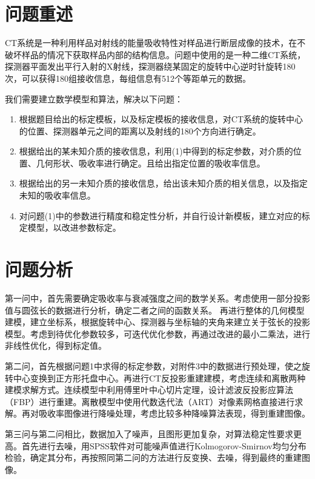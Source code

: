 \documentclass{myart}
\begin{document}
\newpage

\pagestyle{plain}
\section{问题重述}
CT系统是一种利用样品对射线的能量吸收特性对样品进行断层成像的技术，在不破坏样品的情况下获取样品内部的结构信息。问题中使用的是一种二维CT系统，探测器平面发出平行入射的X射线，探测器绕某固定的旋转中心逆时针旋转180次，可以获得180组接收信息，每组信息有512个等距单元的数据。

我们需要建立数学模型和算法，解决以下问题：
\begin{enumerate}

\item 根据题目给出的标定模板，以及标定模板的接收信息，对CT系统的旋转中心的位置、探测器单元之间的距离以及射线的180个方向进行确定。

\item 根据给出的某未知介质的接收信息，利用(1)中得到的标定参数，对介质的位置、几何形状、吸收率进行确定。且给出指定位置的吸收率信息。
\item 根据给出的另一未知介质的接收信息，给出该未知介质的相关信息，以及指定未知的吸收率信息。
\item 对问题(1)中的参数进行精度和稳定性分析，并自行设计新模板，建立对应的标定模型，以改进参数标定。
\end{enumerate}

\section{问题分析}
第一问中，首先需要确定吸收率与衰减强度之间的数学关系。考虑使用一部分投影值与圆弦长的数据进行分析，确定二者之间的函数关系。 再进行整体的几何模型建模，建立坐标系，根据旋转中心、探测器与坐标轴的夹角来建立关于弦长的投影模型。考虑到待优化参数较多，可迭代优化参数，再通过改进的最小二乘法，进行非线性优化，得到标定值。

第二问，首先根据问题1中求得的标定参数，对附件3中的数据进行预处理，使之旋转中心变换到正方形托盘中心。再进行CT反投影重建建模，考虑连续和离散两种建模求解方式。连续模型中利用傅里叶中心切片定理，设计滤波反投影应算法（FBP）进行重建。离散模型中使用代数迭代法（ART）对像素网格直接进行求解。再对吸收率图像进行降噪处理，考虑比较多种降噪算法表现，得到重建图像。

第三问与第二问相比，数据加入了噪声，且图形更加复杂，对算法稳定性要求更高。首先进行去噪，用SPSS软件对可能噪声值进行Kolmogorov-Smirnov均匀分布检验，确定其分布，再按照同第二问的方法进行反变换、去噪，得到最终的重建图像。
\end{document}
